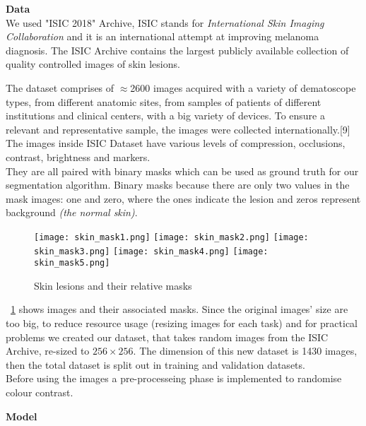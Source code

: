\documentclass[12pt,a4paper,oneside]{report} %
\begin{document}
{\LARGE{\bf Data}}\\

We used "ISIC 2018" Archive, ISIC stands for \textit {International Skin Imaging Collaboration} and it is an international attempt at improving melanoma diagnosis. The ISIC Archive contains the largest publicly available collection of quality controlled images of skin lesions.
\newline

The dataset comprises of $\approx$2600 images acquired with a variety of dematoscope types, from different anatomic sites, from samples of patients of different institutions and clinical centers, with a big variety of devices. To ensure a relevant and representative sample, the images were collected internationally.[9] The images inside ISIC Dataset have various levels of compression, occlusions, contrast, brightness and markers.\\
They are all paired with binary masks which can be used as ground truth for our segmentation algorithm. Binary masks because there are only two values in the mask images: one and zero, 
where the ones indicate the lesion and zeros represent background \textit {(the normal skin)}.\\

\begin{figure}[h!]
\begin{center}
   \texttt{[image: skin\_mask1.png]}
   \texttt{[image: skin\_mask2.png]}
   \texttt{[image: skin\_mask3.png]}
   \texttt{[image: skin\_mask4.png]}
  \texttt{[image: skin\_mask5.png]}
 \caption{Skin lesions and their relative masks}
\label{fig:skinlesionmasks}
\end{center}
\end{figure}

\figurename~\ref{fig:skinlesionmasks} shows images and their associated masks.
Since the original images' size are too big, to reduce resource usage (resizing images for each task) and for practical problems we created our dataset, that takes random images 
from the ISIC Archive, re-sized to $256 × 256$. 
The dimension of this new dataset is 1430 images, then the total dataset is split out in training and validation datasets.\\
Before using the images a pre-processeing phase is implemented to randomise colour contrast.
\newline
{} 
{\LARGE{\bf Model}}\\
\end{document}

